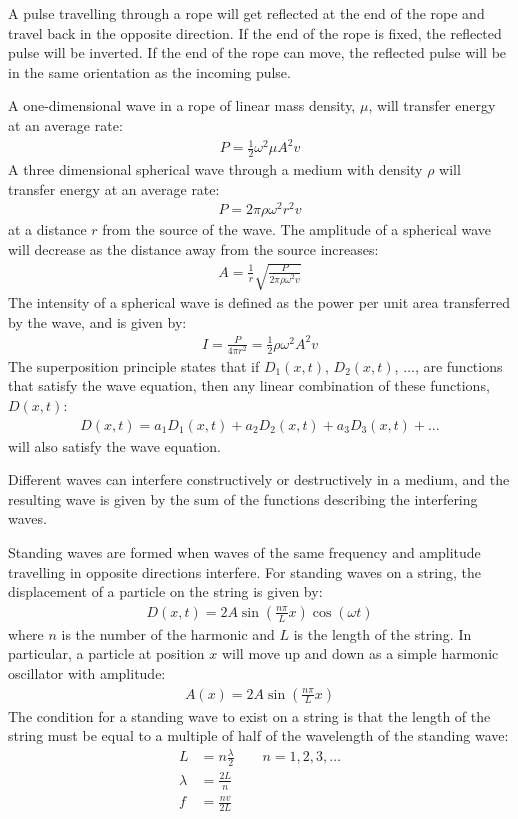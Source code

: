\begin{chapterSummary}
A pulse travelling through a rope will get reflected at the end of the rope and travel back in the opposite direction. If the end of the rope is fixed, the reflected pulse will be inverted. If the end of the rope can move, the reflected pulse will be in the same orientation as the incoming pulse.

A one-dimensional wave in a rope of linear mass density, $\mu$, will transfer energy at an average rate:
\begin{align*}
P = \frac{1}{2}\omega^2\mu A^2 v 
\end{align*}
A three dimensional spherical wave through a medium with density $\rho$ will transfer energy at an average rate:
\begin{align*}
P = 2\pi\rho\omega^2r^2 v
\end{align*}
at a distance $r$ from the source of the wave. The amplitude of a spherical wave will decrease as the distance away from the source increases:
\begin{align*}
A =\frac{1}{r}\sqrt{\frac{P}{2\pi\rho \omega^2 v}}
\end{align*}
The intensity of a spherical wave is defined as the power per unit area transferred by the wave, and is given by:
\begin{align*}
I=\frac{P}{4\pi r^2}=\frac{1}{2}\rho\omega^2A^2v
\end{align*}
The superposition principle states that if $D_1(x,t)$, $D_2(x,t)$, $\dots$, are functions that satisfy the wave equation, then any linear combination of these functions, $D(x,t)$:
\begin{align*}
D(x,t) = a_1D_1(x,t)+a_2D_2(x,t)+a_3D_3(x,t)+\dots
\end{align*}
will also satisfy the wave equation. 

Different waves can interfere constructively or destructively in a medium, and the resulting wave is given by the sum of the functions describing the interfering waves. 

Standing waves are formed when waves of the same frequency and amplitude travelling in opposite directions interfere. For standing waves on a string, the displacement of a particle on the string is given by:
\begin{align*}
D(x,t)=2A\sin\left(\frac{n\pi}{L}x\right)\cos(\omega t)
\end{align*}
where $n$ is the number of the harmonic and $L$ is the length of the string. In particular, a particle at position $x$ will move up and down as a simple harmonic oscillator with amplitude:
\begin{align*}
A(x) = 2A\sin\left(\frac{n\pi}{L}x\right)
\end{align*}
The condition for a standing wave to exist on a string is that the length of the string must be equal to a multiple of half of the wavelength of the standing wave:
\begin{align*}
L &= n\frac{\lambda}{2}\quad\quad n=1,2,3,\dots\\
\lambda &= \frac{2L}{n}\\
f &= \frac{nv}{2L}
\end{align*}


\end{chapterSummary}

